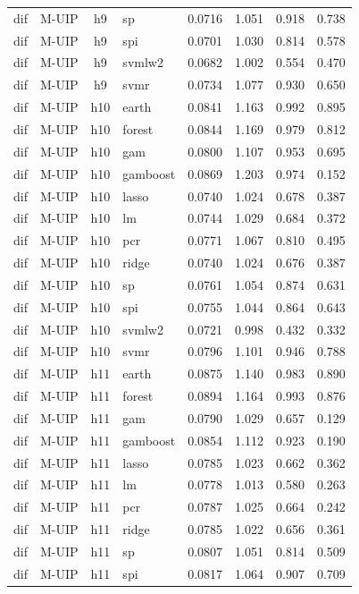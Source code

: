 \begin{ThreePartTable}
\begin{longtable}[t]{llclcccc}
dif & M-UIP & h9 & sp & 0.0716 & 1.051 & 0.918 & 0.738\\
dif & M-UIP & h9 & spi & 0.0701 & 1.030 & 0.814 & 0.578\\
dif & M-UIP & h9 & svmlw2 & 0.0682 & 1.002 & 0.554 & 0.470\\
dif & M-UIP & h9 & svmr & 0.0734 & 1.077 & 0.930 & 0.650\\
\addlinespace
dif & M-UIP & h10 & earth & 0.0841 & 1.163 & 0.992 & 0.895\\
dif & M-UIP & h10 & forest & 0.0844 & 1.169 & 0.979 & 0.812\\
dif & M-UIP & h10 & gam & 0.0800 & 1.107 & 0.953 & 0.695\\
dif & M-UIP & h10 & gamboost & 0.0869 & 1.203 & 0.974 & 0.152\\
dif & M-UIP & h10 & lasso & 0.0740 & 1.024 & 0.678 & 0.387\\
dif & M-UIP & h10 & lm & 0.0744 & 1.029 & 0.684 & 0.372\\
dif & M-UIP & h10 & pcr & 0.0771 & 1.067 & 0.810 & 0.495\\
dif & M-UIP & h10 & ridge & 0.0740 & 1.024 & 0.676 & 0.387\\
dif & M-UIP & h10 & sp & 0.0761 & 1.054 & 0.874 & 0.631\\
dif & M-UIP & h10 & spi & 0.0755 & 1.044 & 0.864 & 0.643\\
dif & M-UIP & h10 & svmlw2 & 0.0721 & 0.998 & 0.432 & 0.332\\
dif & M-UIP & h10 & svmr & 0.0796 & 1.101 & 0.946 & 0.788\\
\addlinespace
dif & M-UIP & h11 & earth & 0.0875 & 1.140 & 0.983 & 0.890\\
dif & M-UIP & h11 & forest & 0.0894 & 1.164 & 0.993 & 0.876\\
dif & M-UIP & h11 & gam & 0.0790 & 1.029 & 0.657 & 0.129\\
dif & M-UIP & h11 & gamboost & 0.0854 & 1.112 & 0.923 & 0.190\\
dif & M-UIP & h11 & lasso & 0.0785 & 1.023 & 0.662 & 0.362\\
dif & M-UIP & h11 & lm & 0.0778 & 1.013 & 0.580 & 0.263\\
dif & M-UIP & h11 & pcr & 0.0787 & 1.025 & 0.664 & 0.242\\
dif & M-UIP & h11 & ridge & 0.0785 & 1.022 & 0.656 & 0.361\\
dif & M-UIP & h11 & sp & 0.0807 & 1.051 & 0.814 & 0.509\\
dif & M-UIP & h11 & spi & 0.0817 & 1.064 & 0.907 & 0.709\\

\end{longtable}
\end{ThreePartTable}
